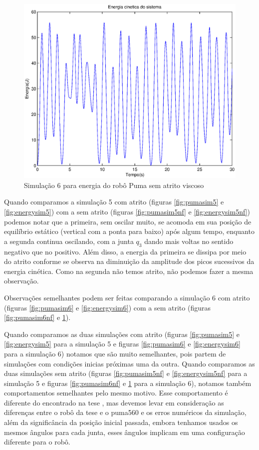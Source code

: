 \documentclass{article}
\begin{document}
\begin{figure}[H]
	\centering
	\includegraphics[width=0.8\linewidth]{../longsims/sime2kin.eps}
	\caption{Simulação 6 para energia do robô Puma sem atrito viscoso}
	\label{fig:energysim6nf}
\end{figure}

Quando comparamos a simulação 5 com atrito (figuras \ref{fig:pumasim5} e \ref{fig:energysim5}) com a sem atrito (figuras \ref{fig:pumasim5nf} e \ref{fig:energysim5nf}) podemos notar que a primeira, sem oscilar muito, se acomoda em sua posição de equilíbrio estático (vertical com a ponta para baixo) após algum tempo, enquanto a segunda continua oscilando, com a junta $q_3$ dando mais voltas no sentido negativo que no positivo. Além disso, a energia da primeira se dissipa por meio do atrito conforme se observa na diminuição da amplitude dos picos sucessivos da energia cinética. Como na segunda não temos atrito, não podemos fazer a mesma observação. 

Observações semelhantes podem ser feitas comparando a simulação 6 com atrito (figuras \ref{fig:pumasim6} e \ref{fig:energysim6}) com a sem atrito (figuras \ref{fig:pumasim6nf} e \ref{fig:energysim6nf}).

Quando comparamos as duas simulações com atrito (figuras \ref{fig:pumasim5} e \ref{fig:energysim5} para a simulação 5 e figuras \ref{fig:pumasim6} e \ref{fig:energysim6} para a simulação 6) notamos que são muito semelhantes, pois partem de simulações com condições inicias próximas uma da outra. Quando comparamos as duas simulações sem atrito (figuras \ref{fig:pumasim5nf} e \ref{fig:energysim5nf} para a simulação 5 e figuras \ref{fig:pumasim6nf} e \ref{fig:energysim6nf} para a simulação 6), notamos também comportamentos semelhantes pelo mesmo motivo. Esse comportamento é diferente do encontrado na tese \cite{bb:tese}, mas devemos levar em consideração as diferenças entre o robô da tese e o puma560 e os erros numéricos da simulação, além da significância da posição inicial passada, embora tenhamos usados os mesmos ângulos para cada junta, esses ângulos implicam em uma configuração diferente para o robô. 
\end{document}
